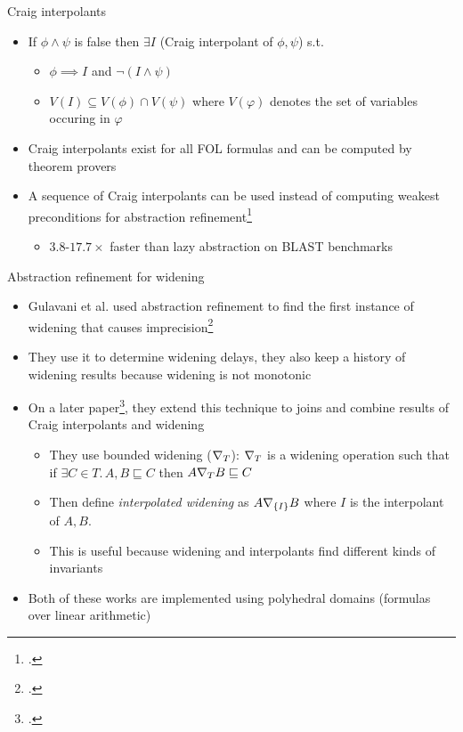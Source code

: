 \documentclass[aspectratio=169]{beamer}
\begin{document}
\begin{frame}{Craig interpolants}
  \begin{itemize}[<+->]
  \item If $\phi \wedge \psi$ is false then $\exists I$ (Craig interpolant of $\phi, \psi$) s.t.
    \begin{itemize}[<+->]
    \item $\phi \implies I$ and $\neg (I \wedge \psi)$
    \item $V(I) \subseteq V(\phi) \cap V(\psi)$ where $V(\varphi)$ denotes the set of variables occuring in $\varphi$
    \end{itemize}
  \item Craig interpolants exist for all FOL formulas and can be computed by theorem provers
  \item A sequence of Craig interpolants can be used instead of computing weakest preconditions for abstraction refinement\footcite{mcmillan2006lazy}\pause
    \begin{itemize}
    \item $3.8$-$17.7\times$ faster than lazy abstraction on BLAST benchmarks
    \end{itemize}
  \end{itemize}
\end{frame}

\begin{frame}{Abstraction refinement for widening}
  \small
  \begin{itemize}[<+->]
  \item Gulavani et al. used abstraction refinement to find the first instance of widening that causes imprecision\footcite{gulavani2006counterexample}
  \item They use it to determine widening delays, they also keep a history of widening results because widening is not monotonic
  \item On a later paper\footcite{gulavani2008automatically}, they extend this technique to joins and combine results of Craig interpolants and widening
    \begin{itemize}\footnotesize
    \item They use bounded widening ($\nabla_T$): $\nabla_T$ is a widening operation such that\\ if $\exists C \in T.\, A, B \sqsubseteq C$ then $A \nabla_T B \sqsubseteq C$
    \item Then define \emph{interpolated widening} as $A \nabla_{\left\{I\right\}} B$ where $I$ is the interpolant of $A, B$.
    \item This is useful because widening and interpolants find different kinds of invariants
    \end{itemize}
  \item Both of these works are implemented using polyhedral domains (formulas over linear arithmetic)
  \end{itemize}
\end{frame}
\end{document}
